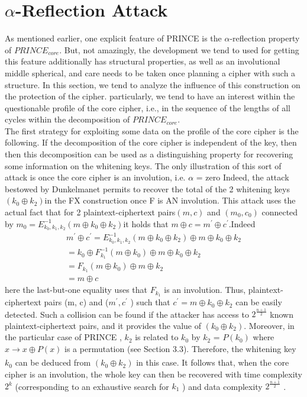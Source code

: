 \documentclass{transcrypto}
\begin{document}
\section{$\alpha$-Reflection Attack}
As mentioned earlier, one explicit feature of PRINCE is the $\alpha$-reflection property of $PRINCE_{core}$. But, not amazingly, the development we tend to used for getting this feature additionally has structural properties, as well as an involutional middle spherical, and care needs to be taken once planning a cipher with such a structure. In this section, we tend to analyze the influence of this construction on the protection of the cipher. particularly, we tend to have an interest within the questionable profile of the core cipher, i.e., in the sequence of the lengths of all cycles within the decomposition of $PRINCE_{core}$.
\\ The first strategy for exploiting some data on the profile of the core cipher is the following. If the decomposition of the core cipher is independent of the key, then then this decomposition can be used as a distinguishing property for recovering some information on the whitening keys. The only illustration of this sort of attack is once the core cipher is an involution, i.e. $\alpha$ = zero Indeed, the attack bestowed by Dunkelmanet permits to recover the total of the 2 whitening keys$(k_{0} \oplus k_{2})$in the FX construction once F is AN involution. This attack uses the actual fact that for 2 plaintext-ciphertext pairs$(m, c)$ and $(m_{0},c_{0})$ connected by $m_{0}=E^{-1}_{k_{0},k_{1},k_{2}}(m \oplus k_{0} \oplus k_{2})$it holds that $m \oplus c=m^{′} \oplus c^{′}$.Indeed
\begin{align*}
    m^{'}\oplus c^{'} = E^{−1}_{k_{0},k_{1},k_{2}}(m \oplus k_{0}\oplus k_{2}) \oplus m \oplus k_{0} \oplus k_{2}
    \\
    =k_{0} \oplus F^{-1}_{k_{1}}(m \oplus k_{0}) \oplus m \oplus k_{0} \oplus k_{2}
    \\
    =F_{k_{1}}(m \oplus k_{0}) \oplus m \oplus k_{2}
    \\
    = m \oplus c
\end{align*}
here the last-but-one equality uses that $F_{k_{1}}$ is an involution. Thus, plaintext-
ciphertext pairs (m, c) and ($m^{'} , c^{'}$ ) such that $c^{'} = m \oplus k_{0} \oplus k_{2}$ can be easily 
detected. Such a collision can be found if the attacker has access to $2^{\frac{n+1}{2}}$  known
plaintext-ciphertext pairs, and it provides the value of $(k_{0} \oplus k_{2} )$. Moreover, in
the particular case of PRINCE , $k_{2}$ is related to $k_{0}$ by $k_{2}$ = $P (k_{0} )$ where $x \xrightarrow[]{} x \oplus P (x)$ is a permutation (see Section 3.3). Therefore, the whitening key $k_{0}$ can be deduced from $(k_{0} \oplus k_{2} )$ in this case. It follows that, when the core cipher is an involution, the whole key can then be recovered with time complexity $2^{k}$ (corresponding to an exhaustive search for $k_{1}$ ) and data complexity $2^{\frac{n+1}{2}}$ .\\
\end{document}

